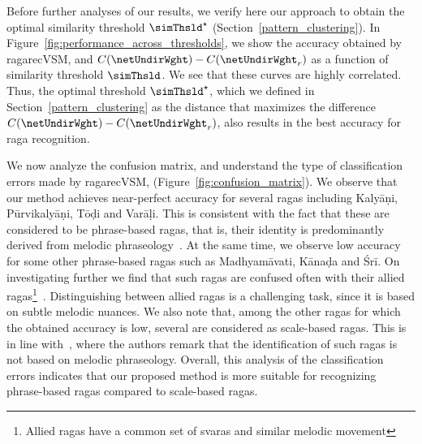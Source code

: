 Before further analyses of our results, we verify here our approach to obtain the optimal similarity threshold $\simThsld^\star$ (Section~\ref{pattern_clustering}). In Figure~\ref{fig:performance_across_thresholds}, we show the accuracy obtained by \acrshort{ragarecVSM}, and  $C(\netUndirWght)-C(\netUndirWght_r)$ as a function of similarity threshold $\simThsld$. We see that these curves are highly correlated. Thus, the optimal threshold $\simThsld^\star$, which we defined in Section~\ref{pattern_clustering} as the distance that maximizes the difference $C(\netUndirWght)-C(\netUndirWght_r)$, also results in the best accuracy for \gls{raga} recognition.

We now analyze the confusion matrix, and understand the type of classification errors made by \acrshort{ragarecVSM}, (Figure~\ref{fig:confusion_matrix}). We observe that our method achieves near-perfect accuracy for several \glspl{raga} including Kaly\={a}\d{n}i, P\={u}rvikaly\={a}\d{n}i, T\={o}\d{d}i and Var\={a}\d{l}i. This is consistent with the fact that these are considered to be phrase-based \glspl{raga}, that is, their identity is predominantly derived from melodic phraseology~\cite{krishna2012carnatic}. At the same time, we observe low accuracy for some other phrase-based \glspl{raga} such as Madhyam\={a}vati, K\={a}na\d{d}a and \'{S}r\={i}. On investigating further we find that such \glspl{raga} are confused often with their allied \glspl{raga}\footnote{Allied \glspl{raga} have a common set of svaras and similar melodic movement}~\cite{krishna2012carnatic}. Distinguishing between allied \glspl{raga} is a challenging task, since it is based on subtle melodic nuances. We also note that, among the other \glspl{raga} for which the obtained accuracy is low, several are considered as scale-based \glspl{raga}. This is in line with~\cite{krishna2012carnatic}, where the authors remark that the identification of such \glspl{raga} is not based on melodic phraseology. Overall, this analysis of the classification errors indicates that our proposed method is more suitable for recognizing phrase-based \glspl{raga} compared to scale-based \glspl{raga}. 


